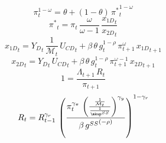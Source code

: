 \documentclass[10pt,a4paper]{article}
\begin{document}
\begin{dmath}
{\pi}_{t}^{1-{\omega}}={\theta}+\left(1-{\theta}\right)\, {\pi^*}_{t}^{1-{\omega}}
\end{dmath}
\begin{dmath}
{\pi^*}_{t}={\pi}_{t}\, \frac{{\omega}}{{\omega}-1}\, \frac{{x_{1D}}_{t}}{{x_{2D}}_{t}}
\end{dmath}
\begin{dmath}
{x_{1D}}_{t}={Y_D}_{t}\, \frac{1}{{\mathcal{M}}_{t}}\, {U_{CD}}_{t}+\beta\, {\theta}\, {g}_{t}^{1-\rho}\, {\pi}_{t+1}^{{\omega}}\, {x_{1D}}_{t+1}
\end{dmath}
\begin{dmath}
{x_{2D}}_{t}={Y_D}_{t}\, {U_{CD}}_{t}+\beta\, {\theta}\, {g}_{t}^{1-\rho}\, {\pi}_{t+1}^{{\omega}-1}\, {x_{2D}}_{t+1}
\end{dmath}
\begin{dmath}
1=\frac{{\Lambda}_{t+1}\, {R}_{t}}{{\pi}_{t+1}}
\end{dmath}
\begin{dmath}
{R}_{t}={R}_{t-1}^{{{\gamma}_{r}}}\, \left(\frac{{\pi}_{t}^{{{\gamma}_{\pi}}}\, \left(\frac{\frac{1}{{\mathcal{M}}_{t}}}{\frac{1}{{\mkup^{SS}}}}\right)^{{{\gamma}_{y}}}}{\beta\, {g^{SS}}^{\left(-\rho\right)}}\right)^{1-{{\gamma}_{r}}}
\end{dmath}
\end{document}
